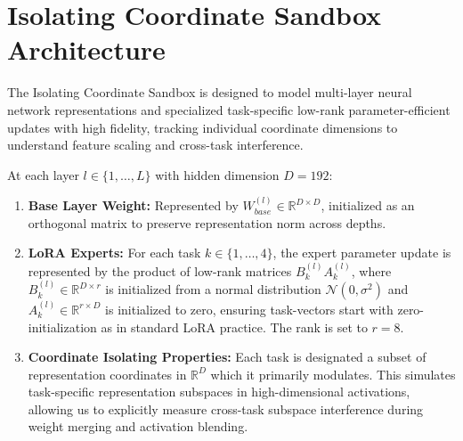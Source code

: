 \documentclass{article}
\theoremstyle{plain}
\theoremstyle{definition}
\theoremstyle{remark}
\begin{document}










\newpage
\appendix
\onecolumn
\section{Isolating Coordinate Sandbox Architecture}
\label{app:sandbox}

The Isolating Coordinate Sandbox is designed to model multi-layer neural network representations and specialized task-specific low-rank parameter-efficient updates with high fidelity, tracking individual coordinate dimensions to understand feature scaling and cross-task interference.

At each layer $l \in \{1, \dots, L\}$ with hidden dimension $D=192$:
\begin{enumerate}
  \item \textbf{Base Layer Weight:} Represented by $W_{base}^{(l)} \in \mathbb{R}^{D \times D}$, initialized as an orthogonal matrix to preserve representation norm across depths.
  \item \textbf{LoRA Experts:} For each task $k \in \{1, \dots, 4\}$, the expert parameter update is represented by the product of low-rank matrices $B_k^{(l)} A_k^{(l)}$, where $B_k^{(l)} \in \mathbb{R}^{D \times r}$ is initialized from a normal distribution $\mathcal{N}(0, \sigma^2)$ and $A_k^{(l)} \in \mathbb{R}^{r \times D}$ is initialized to zero, ensuring task-vectors start with zero-initialization as in standard LoRA practice. The rank is set to $r=8$.
  \item \textbf{Coordinate Isolating Properties:} Each task is designated a subset of representation coordinates in $\mathbb{R}^D$ which it primarily modulates. This simulates task-specific representation subspaces in high-dimensional activations, allowing us to explicitly measure cross-task subspace interference during weight merging and activation blending.
\end{enumerate}
\end{document}
